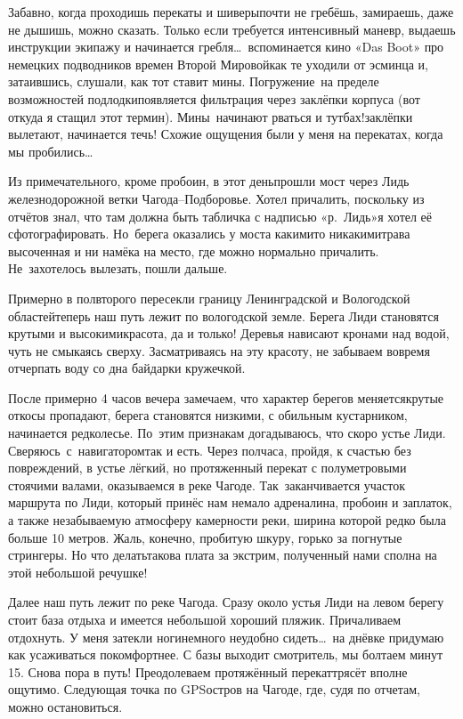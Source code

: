 Забавно, когда проходишь перекаты и шиверы\mdash почти не гребёшь, замираешь, даже не дышишь, можно сказать. Только если требуется интенсивный маневр, выдаешь инструкции экипажу и начинается гребля\ldots~вспоминается кино «Das Boot» про немецких подводников времен Второй Мировой\mdash как те уходили от эсминца и, затаившись, слушали, как тот ставит мины. Погружение~на пределе возможностей подлодки\mdash появляется фильтрация через заклёпки корпуса (вот откуда я стащил этот термин). Мины~начинают рваться и тут\mdash бах!\mdash заклёпки вылетают, начинается течь! Схожие ощущения были у меня на перекатах, когда мы пробились\ldots~

Из примечательного, кроме пробоин, в этот день\mdash прошли мост через Лидь железнодорожной ветки Чагода\nobreakdash--Подборовье. Хотел причалить, поскольку из отчётов знал, что там должна быть табличка с надписью «р.~Лидь»\mdash я хотел её сфотографировать. Но~берега оказались у моста какими\sdash то никакими\mdash трава высоченная и ни намёка на место, где можно нормально причалить. Не~захотелось вылезать, пошли дальше. 

Примерно в полвторого пересекли границу Ленинградской и Вологодской областей\mdash теперь наш путь лежит по вологодской земле. Берега Лиди становятся крутыми и высокими\mdash красота, да и только! Деревья нависают кронами над водой, чуть не смыкаясь сверху. Засматриваясь на эту красоту, не забываем вовремя отчерпать воду со дна байдарки кружечкой.

После примерно 4 часов вечера замечаем, что характер берегов меняется\mdash крутые откосы пропадают, берега становятся низкими, с обильным кустарником, начинается редколесье. По~этим признакам догадываюсь, что скоро устье Лиди. Сверяюсь~с~навигатором\mdash так и есть. Через полчаса, пройдя, к счастью без повреждений, в устье лёгкий, но протяженный перекат с полуметровыми стоячими валами, оказываемся в реке Чагоде. Так~заканчивается участок маршрута по Лиди, который принёс нам немало адреналина, пробоин и заплаток, а также незабываемую атмосферу камерности реки, ширина которой редко была больше 10 метров. Жаль, конечно, пробитую шкуру, горько за погнутые стрингеры. Но что делать\mdash такова плата за экстрим, полученный нами сполна на этой небольшой речушке! 

Далее наш путь лежит по реке Чагода. Сразу около устья Лиди на левом берегу стоит база отдыха и имеется небольшой хороший пляжик. Причаливаем отдохнуть. У меня затекли ноги\mdash немного неудобно сидеть\ldots~на днёвке придумаю как усаживаться покомфортнее. С базы выходит смотритель, мы болтаем минут 15. Снова пора в путь! Преодолеваем протяжённый перекат\mdash трясёт вполне ощутимо. Следующая точка по GPS\mdash остров на Чагоде, где, судя по отчетам, можно остановиться. 


